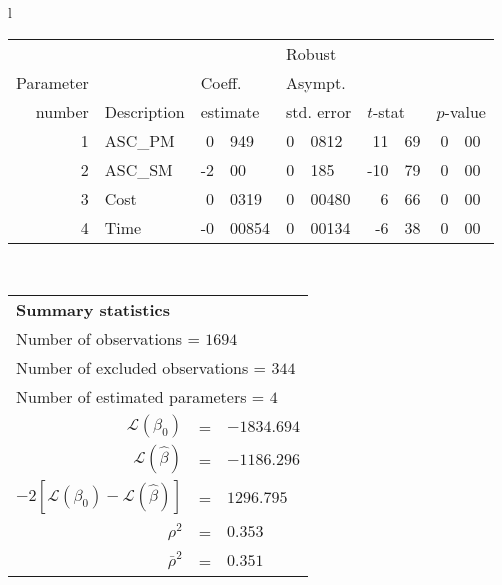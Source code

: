   \begin{tabular}{l}
\begin{tabular}{rlr@{.}lr@{.}lr@{.}lr@{.}l}
         &                       &   \multicolumn{2}{l}{}    & \multicolumn{2}{l}{Robust}  &     \multicolumn{4}{l}{}   \\
Parameter &                       &   \multicolumn{2}{l}{Coeff.}      & \multicolumn{2}{l}{Asympt.}  &     \multicolumn{4}{l}{}   \\
number &  Description                     &   \multicolumn{2}{l}{estimate}      & \multicolumn{2}{l}{std. error}  &   \multicolumn{2}{l}{$t$-stat}  &   \multicolumn{2}{l}{$p$-value}   \\

\hline

1 & ASC_PM  & 0&949 & 0&0812 & 11&69 & 0&00\\
2 & ASC_SM & -2&00 & 0&185 & -10&79 & 0&00\\
3 & Cost & 0&0319 & 0&00480 & 6&66 & 0&00\\
4 & Time & -0&00854 & 0&00134 & -6&38 & 0&00\\
\hline
\end{tabular}
\\
\begin{tabular}{rcl}
\multicolumn{3}{l}{\bf Summary statistics}\\
\multicolumn{3}{l}{ Number of observations = $1694$} \\
\multicolumn{3}{l}{ Number of excluded observations = $344$} \\
\multicolumn{3}{l}{ Number of estimated  parameters = $4$} \\
 $\mathcal{L}(\beta_0)$ &=&  $-1834.694$ \\
 $\mathcal{L}(\hat{\beta})$ &=& $-1186.296 $  \\
 $-2[\mathcal{L}(\beta_0) -\mathcal{L}(\hat{\beta})]$ &=& $1296.795$ \\
    $\rho^2$ &=&   $0.353$ \\
    $\bar{\rho}^2$ &=&    $0.351$ \\
\end{tabular}
  \end{tabular}
